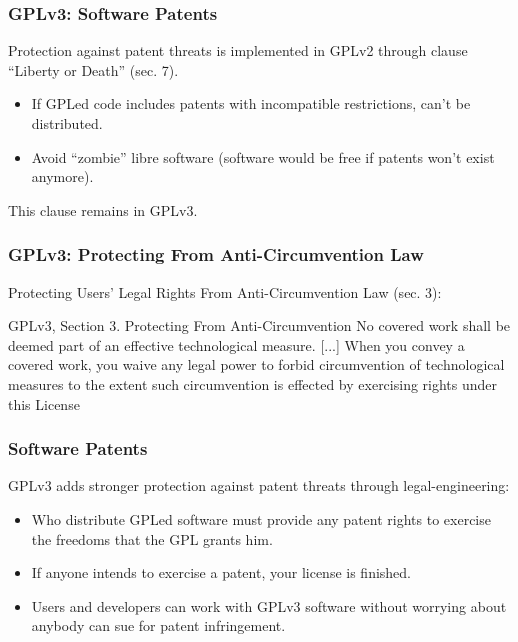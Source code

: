 
\begin{frame}
\frametitle{GPLv3: Software Patents}
Protection against patent threats is implemented in GPLv2 through clause ``Liberty or Death'' (sec. 7).

\begin{itemize}
\item If GPLed code includes patents with incompatible restrictions, can't be distributed.
\item Avoid ``zombie'' libre software (software would be free if patents won't exist anymore).
\end{itemize}

{\centerline{This clause remains in GPLv3.}}


\end{frame}


\begin{frame}
\frametitle{GPLv3: Protecting From Anti-Circumvention Law}
Protecting Users' Legal Rights From Anti-Circumvention Law (sec. 3):

\begin{block}{GPLv3, Section 3. Protecting From Anti-Circumvention}
No covered work shall be deemed part of an effective technological measure. [...]      When you convey a covered work, you waive any legal power to forbid circumvention of
technological measures to the extent such circumvention is effected by exercising rights
under this License 
 \end{block}


\end{frame}



\begin{frame}
\frametitle{Software Patents}
GPLv3 adds stronger protection against patent threats through legal-engineering:

\begin{itemize}
\item Who distribute GPLed software must provide any patent rights to exercise the freedoms that the GPL grants him.
\item If anyone intends to exercise a patent, your license is finished.
\item Users and developers can work with GPLv3 software without worrying about anybody can sue for patent infringement.
\end{itemize}


\end{frame}

